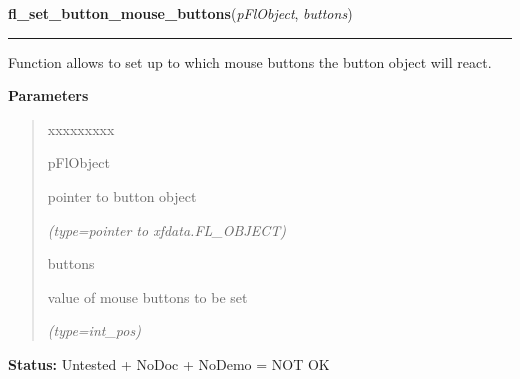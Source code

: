 \hspace{.8\funcindent}\begin{boxedminipage}{\funcwidth}

    \raggedright \textbf{fl\_set\_button\_mouse\_buttons}(\textit{pFlObject}, \textit{buttons})

    \vspace{-1.5ex}

    \rule{\textwidth}{0.5\fboxrule}
\setlength{\parskip}{2ex}
    Function allows to set up to which mouse buttons the button object will
    react.

\setlength{\parskip}{1ex}
      \textbf{Parameters}
      \vspace{-1ex}

      \begin{quote}
        \begin{Ventry}{xxxxxxxxx}

          \item[pFlObject]

          pointer to button object

            {\it (type=pointer to xfdata.FL\_OBJECT)}

          \item[buttons]

          value of mouse buttons to be set

            {\it (type=int\_pos)}

        \end{Ventry}

      \end{quote}

\textbf{Status:} Untested + NoDoc + NoDemo = NOT OK



    \end{boxedminipage}

    \label{xformslib:flbutton:fl_get_button_mouse_buttons}

    \vspace{0.5ex}

